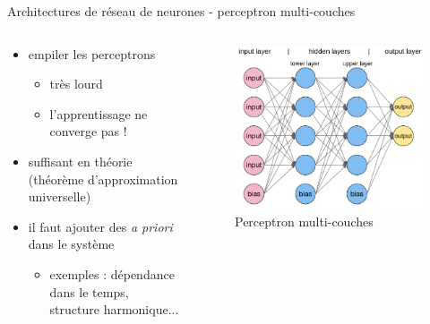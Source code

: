 \documentclass[9pt, aspectratio=169]{beamer}
\begin{document}
\begin{frame}{Architectures de réseau de neurones - perceptron multi-couches} %
\begin{columns}
    \begin{column}{0.48\textwidth}

\begin{itemize}
	\item empiler les perceptrons
	\begin{itemize}
		\item très lourd
		\item l'apprentissage ne converge pas ! 
\end{itemize}
	\item suffisant en théorie (théorème d'approximation universelle)
	\item il faut ajouter des \emph{a priori} dans le système
	\begin{itemize}
		\item exemples : dépendance dans le temps, structure harmonique...
	\end{itemize}
\end{itemize}

    \end{column}
    \begin{column}{0.48\textwidth}
    \begin{figure}
		\includegraphics[width=.6\textwidth]{fig/mlp.png}
		\caption{Perceptron multi-couches}
	\end{figure}
	
    \end{column}
\end{columns}

\end{frame}
\end{document}
